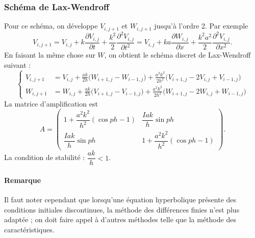 \subsubsection{Schéma de Lax-Wendroff}

Pour ce schéma, on développe $V_{i,j+1}$ et $W_{i,j+1}$ jusqu'à l'ordre 2.
Par exemple
\[
  V_{i,j+1} = V_{i,j} + k\frac{\partial V_{i,j}}{\partial t}
            + \frac{k^2}{2}\frac{\partial^2 V_{i,j}}{\partial t^2}
            = V_{i,j} + ka\frac{\partial W_{i,j}}{\partial x}
            + \frac{k^2a^2}{2}\frac{\partial^2 V_{i,j}}{\partial x^2} .
\]
En faisant la même chose sur $W$, on obtient le schéma discret de
Lax-Wendroff suivant :
\[
  \left\{
  \begin{aligned}
    V_{i,j+1} &= V_{i,j} + \frac{ak}{2h}\bigl(W_{i+1,j} - W_{i-1,j}\bigr)
               + \frac{a^2k^2}{2h^2}\bigl(V_{i+1,j} - 2V_{i,j} + V_{i-1,j}\bigr)\\[0.3em]
    W_{i,j+1} &= W_{i,j} + \frac{ak}{2h}\bigl(V_{i+1,j} - V_{i-1,j}\bigr)
               + \frac{a^2k^2}{2h^2}\bigl(W_{i+1,j} - 2W_{i,j} + W_{i-1,j}\bigr)
  \end{aligned}
  \right.
\]
La matrice d'amplification est
\[
  A = \begin{pmatrix}
    1 + \dfrac{a^2k^2}{h^2}(\cos ph - 1) & \dfrac{Iak}{h}\sin ph\\[1em]
    \dfrac{Iak}{h}\sin ph & 1 + \dfrac{a^2k^2}{h^2}(\cos ph - 1)
  \end{pmatrix}.
\]
La condition de stabilité : $\dfrac{ak}{h} < 1$.

\paragraph{Remarque} Il faut noter cependant que lorsqu'une équation
hyperbolique présente des conditions initiales discontinues, la méthode des
différences finies n'est plus adaptée ; on doit faire appel à d'autres
méthodes telle que la méthode des caractéristiques.
